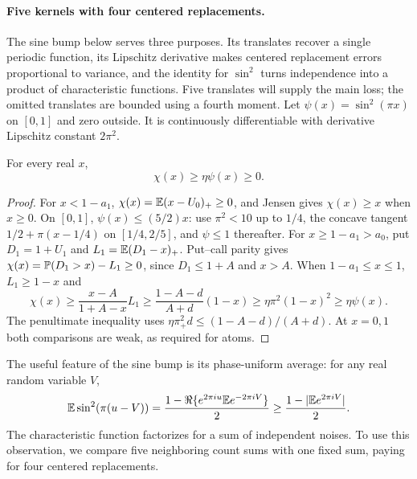 \paragraph{Five kernels with four centered replacements.}
The sine bump below serves three purposes. Its translates recover a
single periodic function, its Lipschitz derivative makes centered
replacement errors proportional to variance, and the identity for
$\sin^2$ turns independence into a product of characteristic functions.
Five translates will supply the main loss; the omitted translates are
bounded using a fourth moment.
Let $\psi(x)=\sin^2(\pi x)$ on $[0,1]$ and zero outside.
It is continuously differentiable with derivative Lipschitz constant
$2\pi^2$.
\begin{lemma}
\label{short:count:kernel-lemma}
For every real $x$,
\begin{equation}\label{short:count:kernel}
 \chi(x)\ge\eta\psi(x)\ge0.
\end{equation}
\end{lemma}
\begin{proof}
For $x<1-a_1$, $\chi(x)=\mathbb E(x-U_0)_+\ge0$, and Jensen gives $\chi(x)\ge x$
when $x\ge0$. On $[0,1]$, $\psi(x)\le(5/2)x$: use $\pi^2<10$ up to
$1/4$, the concave tangent $1/2+\pi(x-1/4)$ on $[1/4,2/5]$, and
$\psi\le1$ thereafter. For $x\ge1-a_1>a_0$, put $D_1=1+U_1$ and
$L_1=\mathbb E(D_1-x)_+$. Put--call parity gives
$\chi(x)=\mathbb P(D_1>x)-L_1\ge0$, since $D_1\le1+A$ and $x>A$.
When $1-a_1\le x\le1$, $L_1\ge1-x$ and
\[
 \chi(x)\ge\frac{x-A}{1+A-x}L_1
 \ge\frac{1-A-d}{A+d}(1-x)
 \ge\eta\pi^2(1-x)^2\ge\eta \psi(x).
\]
The penultimate inequality uses
$\eta\pi_+^2d\le(1-A-d)/(A+d)$.
At $x=0,1$ both comparisons are weak, as required for atoms.
\end{proof}

The useful feature of the sine bump is its phase-uniform average: for any
real random variable $V$,
\[
 \mathbb E\sin^2(\pi(u-V))
 =\frac{1-\Re\{e^{2\pi i u}\mathbb E e^{-2\pi iV}\}}2
 \ge\frac{1-|\mathbb E e^{2\pi iV}|}{2}.
\]
The characteristic function factorizes for a sum of independent noises.
To use this observation, we compare five neighboring count sums with
one fixed sum, paying for four centered replacements.

